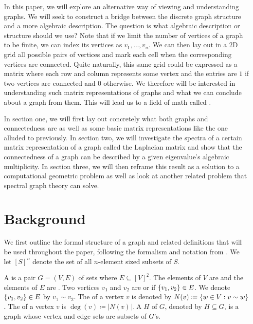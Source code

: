 \documentclass[11pt]{article}
\begin{document}
In this paper, we will explore an alternative way of viewing and understanding graphs. We will seek to construct a bridge between the discrete graph structure and a more algebraic description. The question is what algebraic description or structure should we use? Note that if we limit the number of vertices of a graph to be finite, we can index its vertices as $v_1, \ldots, v_n$. We can then lay out in a $2$D grid all possible pairs of vertices and mark each cell when the corresponding vertices are connected. Quite naturally, this same grid could be expressed as a matrix where each row and column represents some vertex and the entries are $1$ if two vertices are connected and $0$ otherwise. We therefore will be interested in understanding such matrix representations of graphs and what we can conclude about a graph from them. This will lead us to a field of math called .

In section one, we will first lay out concretely what both graphs and connectedness are as well as some basic matrix representations like the one alluded to previously. In section two, we will investigate the spectra of a certain matrix representation of a graph called the Laplacian matrix and show that the connectedness of a graph can be described by a given eigenvalue's algebraic multiplicity. In section three, we will then reframe this result as a solution to a computational geometric problem as well as look at another related problem that spectral graph theory can solve.


\section{Background}

We first outline the formal structure of a graph and related definitions that will be used throughout the paper, following the formalism and notation from \cite{diestelGraphTheory2017}. We let $[S]^n$ denote the set of all $n$-element sized subsets of $S$.

\begin{definition}
    A  is a pair $G = (V, E)$ of sets where $E \subseteq [V]^2$. The elements of $V$ are  and the elements of $E$ are . Two vertices $v_1$ and $v_2$ are  or  if $\qty{v_1, v_2} \in E$. We denote $\qty{v_1, v_2} \in E$ by $v_1 \sim v_2$. The  of a vertex $v$ is denoted by $N(v) \coloneq \qty{w \in V : v \sim w}$. The  of a vertex $v$ is $\deg(v) \coloneq |N(v)|$. A  $H$ of $G$, denoted by $H \subseteq G$, is a graph whose vertex and edge sets are subsets of $G$'s.
\end{definition}
\end{document}
